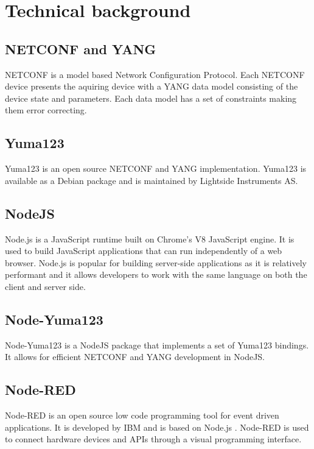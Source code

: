 \documentclass[12pt]{article}
\begin{document}
\section{Technical background}

\subsection{NETCONF and YANG}
NETCONF \cite{ennsNetworkConfigurationProtocol2011} is a model based Network Configuration Protocol.
Each NETCONF device presents the aquiring device with a YANG \cite{bjorklundYANG11Data2016} data model
consisting of the device state and parameters. 
Each data model has a set of constraints making them error correcting.

\subsection{Yuma123}
Yuma123 \cite{vassilevVlvassilevYuma1232025} is an open source NETCONF and YANG implementation.
Yuma123 is available as a Debian package and is maintained by Lightside Instruments AS.

\subsection{NodeJS}
Node.js \cite{NodejsRunJavaScript} is a JavaScript runtime built on Chrome's V8 JavaScript engine.
It is used to build JavaScript applications that can run independently of a web browser.
Node.js is popular for building server-side applications as it is relatively performant and 
it allows developers to work with the same language on both the client and server side.

\subsection{Node-Yuma123}
Node-Yuma123 \cite{Nodeyuma1232025} is a NodeJS package that implements a set of Yuma123 bindings.
It allows for efficient NETCONF and YANG development in NodeJS.

\subsection{Node-RED}
Node-RED \cite{LowcodeProgrammingEventdriven} is an open source low code programming tool for event driven applications.
It is developed by IBM and is based on Node.js \cite{NodejsRunJavaScript}.
Node-RED is used to connect hardware devices and APIs through a visual programming interface.
\end{document}

